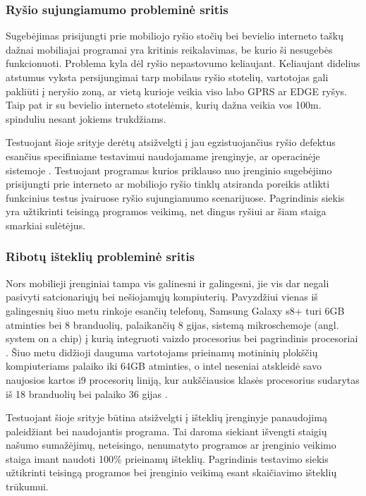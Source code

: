 \documentclass{VUMIFPSkursinis}
\begin{document}
\subsubsection{Ryšio sujungiamumo probleminė sritis}
Sugebėjimas prisijungti prie mobiliojo ryšio stočių bei bevielio interneto taškų dažnai mobiliajai programai yra kritinis reikalavimas, be kurio ši nesugebės funkcionuoti. Problema kyla dėl ryšio nepastovumo keliaujant. Keliaujant didelius atstumus vyksta persijungimai tarp mobilaus ryšio stotelių, vartotojas gali pakliūti į neryšio zoną, ar vietą kurioje veikia viso labo GPRS ar EDGE ryšys. Taip pat ir su bevielio interneto stotelėmis, kurių dažna veikia vos 100m. spinduliu nesant jokiems trukdžiams. 

Testuojant šioje srityje derėtų atsižvelgti į jau egzistuojančius ryšio defektus esančius specifiniame testavimui naudojamame įrenginyje, ar operacinėje sistemoje \cite{android_bugs}. Testuojant programas kurios priklauso nuo įrenginio sugebėjimo prisijungti prie interneto ar mobiliojo ryšio tinklų atsiranda poreikis atlikti funkcinius testus įvairuose ryšio sujungiamumo scenarijuose. Pagrindinis siekis yra užtikrinti teisingą programos veikimą, net dingus ryšiui ar šiam staiga smarkiai sulėtėjus.

\subsubsection{Ribotų išteklių probleminė sritis}
Nors mobilieji įrenginiai tampa vis galinesni ir galingesni, jie vis dar negali pasivyti satcionariųjų bei nešiojamųjų kompiuterių. Pavyzdžiui vienas iš galingesnių šiuo metu rinkoje esančių telefonų, Samsung Galaxy s8+ turi 6GB atminties bei 8 branduolių, palaikančių 8 gijas, sistemą mikroschemoje (angl. system on a chip) į kurią integruoti vaizdo procesorius bei pagrindinis procesoriai \cite{samsung_s8}. Šiuo metu didžioji dauguma vartotojams prieinamų motininių plokščių kompiuteriams palaiko iki 64GB atminties, o intel neseniai atskleidė savo naujosios kartos i9 procesorių liniją, kur aukščiausios klasės procesorius sudarytas iš 18 branduolių bei palaiko 36 gijas \cite{intel_i9}.

Testuojant šioje srityje būtina atsižvelgti į išteklių įrenginyje panaudojimą paleidžiant bei naudojantis programa. Tai daroma siekiant išvengti staigių našumo sumažėjimų, neteisingo, nenumatyto programos ar įrenginio veikimo staiga imant naudoti 100\% prieinamų išteklių. Pagrindinis testavimo siekis užtikrinti teisingą programos bei įrenginio veikimą esant skaičiavimo išteklių trūkumui.
\end{document}
